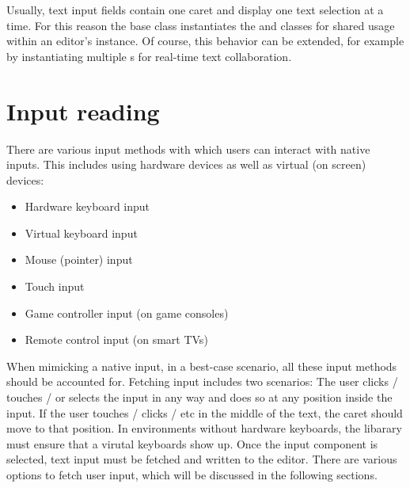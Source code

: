 
Usually, text input fields contain one caret and display one text selection at a time. For this reason the  base class instantiates the  and  classes for shared usage within an editor's instance. Of course, this behavior can be extended, for example by instantiating multiple s for real-time text collaboration.






\section{Input reading}

There are various input methods with which users can interact with native inputs. This includes using hardware devices as well as virtual (on screen) devices:

\begin{itemize} 
\item Hardware keyboard input
\item Virtual keyboard input
\item Mouse (pointer) input
\item Touch input
\item Game controller input (on game consoles)
\item Remote control input (on smart TVs)
\end{itemize}

When mimicking a native input, in a best-case scenario, all these input methods should be accounted for. Fetching input includes two scenarios: The user clicks / touches / or selects the input in any way and does so at any position inside the input. If the user touches / clicks / etc in the middle of the text, the caret should move to that position. In environments without hardware keyboards, the libarary must ensure that a virutal keyboards show up. Once the input component is selected, text input must be fetched and written to the editor. There are various options to fetch user input, which will be discussed in the following sections.


